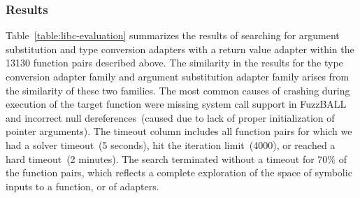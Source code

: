 \subsubsection{Results}
%
Table~\ref{table:libc-evaluation} summarizes the results of searching for argument substitution and type conversion adapters with a return value adapter within the 13130 function pairs described above.
%
The similarity in the results for the type conversion adapter family and argument substitution adapter family arises from the similarity of these two families.
%
%
%
%
The most common causes of crashing during execution of the target function were missing system call support in FuzzBALL and incorrect null dereferences~(caused due to lack of proper initialization of pointer arguments).
%
The timeout column includes all function pairs for which we had a solver timeout~(5 seconds), hit the iteration limit~(4000), or reached a hard timeout~(2 minutes).
%
The search terminated without a timeout for 70\% of the function pairs, which reflects a complete exploration of the space of symbolic inputs to a function, or of adapters.
%
%
%
%
%
%
%
%
%

